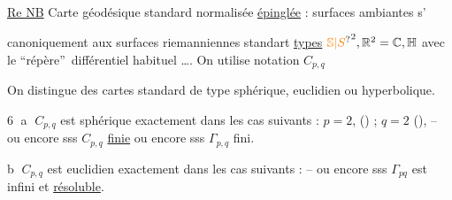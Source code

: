 \uline{Re NB} Carte géodésique standard normalisée \uline{épinglée} :  surfaces ambiantes s'%

canoniquement aux surfaces riemanniennes standart \uline{types} ${\unsure{\mathbb S|S}}^2,\mathbb R^2=\mathbb C,\mathbb H$ avec le \textquotedblleft répère\textquotedblright\ différentiel habituel \ldots. On utilise  notation $C_{p,q}$

 On distingue  des cartes standard de type sphérique, euclidien ou hyperbolique.

\textcircled{6} \textcircled{a}  $C_{p,q}$ est sphérique  exactement dans les cas suivants :  $p=2$, () ; $q=2$ (), 
-- ou encore sss $C_{p,q}$ \uline{finie} ou encore sss $\Gamma_{p,q}$ fini.

\textcircled{b} $C_{p,q}$ est euclidien exactement dans les cas suivants : 
 -- ou encore sss $\Gamma_{pq}$ est infini et \uline{résoluble}.

